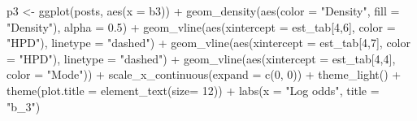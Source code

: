 \documentclass[12pt]{article}
\newenvironment{Shaded}{\begin{snugshade}}{\end{snugshade}}
\newcommand{\AttributeTok}[1]{\textcolor[rgb]{0.77,0.63,0.00}{#1}}
\newcommand{\DecValTok}[1]{\textcolor[rgb]{0.00,0.00,0.81}{#1}}
\newcommand{\FloatTok}[1]{\textcolor[rgb]{0.00,0.00,0.81}{#1}}
\newcommand{\FunctionTok}[1]{\textcolor[rgb]{0.00,0.00,0.00}{#1}}
\newcommand{\NormalTok}[1]{#1}
\newcommand{\OtherTok}[1]{\textcolor[rgb]{0.56,0.35,0.01}{#1}}
\newcommand{\SpecialCharTok}[1]{\textcolor[rgb]{0.00,0.00,0.00}{#1}}
\newcommand{\StringTok}[1]{\textcolor[rgb]{0.31,0.60,0.02}{#1}}
\begin{document}
\begin{Shaded}
\begin{Highlighting}[]
\NormalTok{p3 }\OtherTok{\textless{}{-}} \FunctionTok{ggplot}\NormalTok{(posts, }\FunctionTok{aes}\NormalTok{(}\AttributeTok{x =}\NormalTok{ b3)) }\SpecialCharTok{+}
  \FunctionTok{geom\_density}\NormalTok{(}\FunctionTok{aes}\NormalTok{(}\AttributeTok{color =} \StringTok{"Density"}\NormalTok{, }\AttributeTok{fill =} \StringTok{"Density"}\NormalTok{), }\AttributeTok{alpha =} \FloatTok{0.5}\NormalTok{) }\SpecialCharTok{+}
  \FunctionTok{geom\_vline}\NormalTok{(}\FunctionTok{aes}\NormalTok{(}\AttributeTok{xintercept =}\NormalTok{ est\_tab[}\DecValTok{4}\NormalTok{,}\DecValTok{6}\NormalTok{], }\AttributeTok{color =} \StringTok{"HPD"}\NormalTok{), }\AttributeTok{linetype =} \StringTok{"dashed"}\NormalTok{) }\SpecialCharTok{+}
  \FunctionTok{geom\_vline}\NormalTok{(}\FunctionTok{aes}\NormalTok{(}\AttributeTok{xintercept =}\NormalTok{ est\_tab[}\DecValTok{4}\NormalTok{,}\DecValTok{7}\NormalTok{], }\AttributeTok{color =} \StringTok{"HPD"}\NormalTok{), }\AttributeTok{linetype =} \StringTok{"dashed"}\NormalTok{) }\SpecialCharTok{+}
  \FunctionTok{geom\_vline}\NormalTok{(}\FunctionTok{aes}\NormalTok{(}\AttributeTok{xintercept =}\NormalTok{ est\_tab[}\DecValTok{4}\NormalTok{,}\DecValTok{4}\NormalTok{], }\AttributeTok{color =} \StringTok{"Mode"}\NormalTok{)) }\SpecialCharTok{+}
  \FunctionTok{scale\_x\_continuous}\NormalTok{(}\AttributeTok{expand =} \FunctionTok{c}\NormalTok{(}\DecValTok{0}\NormalTok{, }\DecValTok{0}\NormalTok{)) }\SpecialCharTok{+}
  \FunctionTok{theme\_light}\NormalTok{() }\SpecialCharTok{+}
  \FunctionTok{theme}\NormalTok{(}\AttributeTok{plot.title =} \FunctionTok{element\_text}\NormalTok{(}\AttributeTok{size=} \DecValTok{12}\NormalTok{)) }\SpecialCharTok{+} 
  \FunctionTok{labs}\NormalTok{(}\AttributeTok{x =} \StringTok{"Log odds"}\NormalTok{,}
       \AttributeTok{title =} \StringTok{"b\_3"}\NormalTok{)}


\end{Highlighting}
\end{Shaded}
\end{document}
